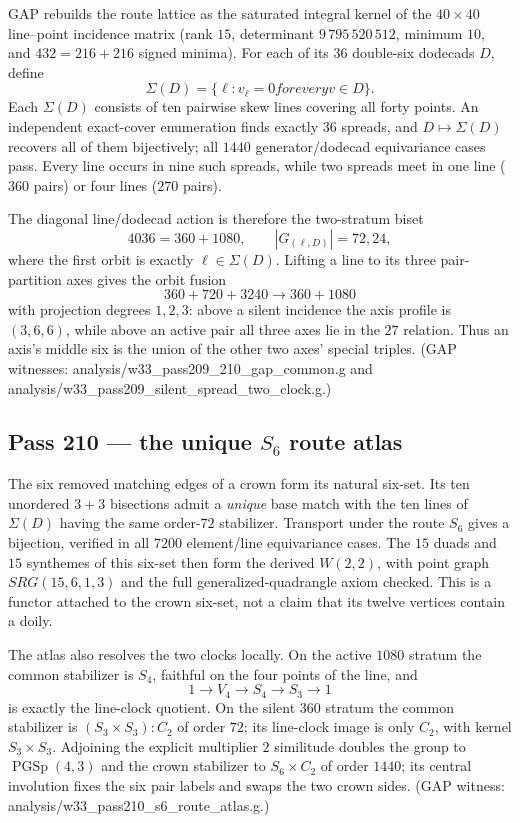 \documentclass[12pt,a4paper]{article}
\def\mathrm#1{#1}%
\def\texttt#1{#1}%
\def\text#1{#1}%
\def\cdot{ }%
\theoremstyle{definition}
\newcommand{\SRG}{\mathrm{SRG}}
\begin{document}
GAP rebuilds the route lattice as the saturated integral kernel of the
$40\times40$ line--point incidence matrix (rank $15$, determinant
$9\,795\,520\,512$, minimum $10$, and $432=216+216$ signed minima).  For
each of its $36$ double-six dodecads $D$, define
\[
  \Sigma(D)=\{\ell: v_\ell=0\text{ for every }v\in D\}.
\]
Each $\Sigma(D)$ consists of ten pairwise skew lines covering all forty
points.  An independent exact-cover enumeration finds exactly $36$ spreads,
and $D\mapsto\Sigma(D)$ recovers all of them bijectively; all $1440$
generator/dodecad equivariance cases pass.  Every line occurs in nine such
spreads, while two spreads meet in one line ($360$ pairs) or four lines
($270$ pairs).

The diagonal line/dodecad action is therefore the two-stratum biset
\[
  40\cdot36=360+1080,
  \qquad |G_{(\ell,D)}|=72,24,
\]
where the first orbit is exactly $\ell\in\Sigma(D)$.  Lifting a line to its
three pair-partition axes gives the orbit fusion
\[
  360+720+3240\longrightarrow360+1080
\]
with projection degrees $1,2,3$: above a silent incidence the axis profile
is $(3,6,6)$, while above an active pair all three axes lie in the $27$
relation.  Thus an axis's middle six is the union of the other two axes'
special triples. (GAP witnesses:
\texttt{analysis/w33\_pass209\_210\_gap\_common.g} and
\texttt{analysis/w33\_pass209\_silent\_spread\_two\_clock.g}.)

\subsection{Pass 210 --- the unique $S_6$ route atlas}
\label{ssec:pass210}

The six removed matching edges of a crown form its natural six-set.  Its
ten unordered $3{+}3$ bisections admit a \emph{unique} base match with the
ten lines of $\Sigma(D)$ having the same order-$72$ stabilizer.  Transport
under the route $S_6$ gives a bijection, verified in all $7200$ element/line
equivariance cases.  The $15$ duads and $15$ synthemes of this six-set then
form the derived $W(2,2)$, with point graph $\SRG(15,6,1,3)$ and the full
generalized-quadrangle axiom checked.  This is a functor attached to the
crown six-set, not a claim that its twelve vertices contain a doily.

The atlas also resolves the two clocks locally.  On the active $1080$
stratum the common stabilizer is $S_4$, faithful on the four points of the
line, and
\[
  1\longrightarrow V_4\longrightarrow S_4\longrightarrow S_3
  \longrightarrow1
\]
is exactly the line-clock quotient.  On the silent $360$ stratum the common
stabilizer is $(S_3\times S_3){:}C_2$ of order $72$; its line-clock image is
only $C_2$, with kernel $S_3\times S_3$.  Adjoining the explicit multiplier
$2$ similitude doubles the group to $\operatorname{PGSp}(4,3)$ and the
crown stabilizer to $S_6\times C_2$ of order $1440$; its central involution
fixes the six pair labels and swaps the two crown sides. (GAP witness:
\texttt{analysis/w33\_pass210\_s6\_route\_atlas.g}.)
\end{document}
